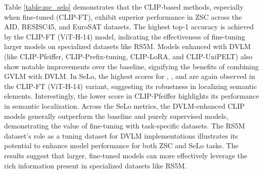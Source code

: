 \documentclass[journal]{IEEEtran}
\begin{document}
Table \ref{table:zsc_selo} demonstrates that the CLIP-based methods, especially when fine-tuned (CLIP-FT), exhibit superior performance in ZSC across the AID, RESISC45, and EuroSAT datasets. The highest top-1 accuracy is achieved by the CLIP-FT (ViT-H-14) model, indicating the effectiveness of fine-tuning larger models on specialized datasets like RS5M. Models enhanced with DVLM (like CLIP-Pfeiffer, CLIP-Prefix-tuning, CLIP-LoRA, and CLIP-UniPELT) also show notable improvements over the baseline, signifying the benefits of combining GVLM with DVLM. In SeLo, the highest scores for , , and  are again observed in the CLIP-FT (ViT-H-14) variant, suggesting its robustness in localizing semantic elements. Interestingly, the lower  score in CLIP-Pfeiffer highlights its performance in semantic localization. Across the SeLo metrics, the DVLM-enhanced CLIP models generally outperform the baseline and purely supervised models, demonstrating the value of fine-tuning with task-specific datasets. The RS5M dataset's role as a tuning dataset for DVLM implementations illustrates its potential to enhance model performance for both ZSC and SeLo tasks. The results suggest that larger, fine-tuned models can more effectively leverage the rich information present in specialized datasets like RS5M.
\end{document}
